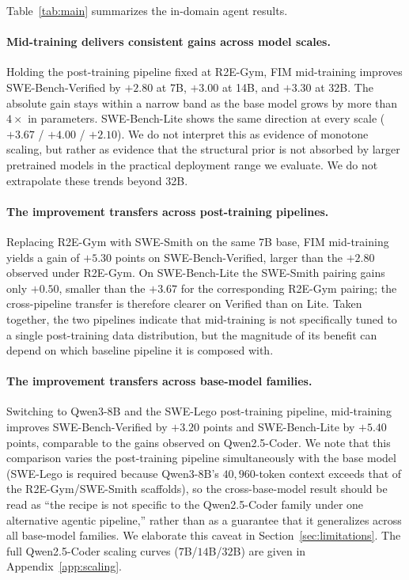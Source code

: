 Table~\ref{tab:main} summarizes the in-domain agent results.

\paragraph{Mid-training delivers consistent gains across model scales.}
Holding the post-training pipeline fixed at R2E-Gym, FIM mid-training
improves SWE-Bench-Verified by $+2.80$ at 7B, $+3.00$ at 14B, and $+3.30$
at 32B. The absolute gain stays within a narrow band as the base model
grows by more than $4{\times}$ in parameters. SWE-Bench-Lite shows the
same direction at every scale ($+3.67$ / $+4.00$ / $+2.10$). We do not
interpret this as evidence of monotone scaling, but rather as evidence
that the structural prior is not absorbed by larger pretrained models in
the practical deployment range we evaluate. We do not extrapolate these
trends beyond 32B.

\paragraph{The improvement transfers across post-training pipelines.}
Replacing R2E-Gym with SWE-Smith on the same 7B base, FIM mid-training
yields a gain of $+5.30$ points on SWE-Bench-Verified, larger than the
$+2.80$ observed under R2E-Gym. On SWE-Bench-Lite the SWE-Smith pairing
gains only $+0.50$, smaller than the $+3.67$ for the corresponding
R2E-Gym pairing; the cross-pipeline transfer is therefore clearer on
Verified than on Lite. Taken together, the two pipelines indicate that
mid-training is not specifically tuned to a single post-training data
distribution, but the magnitude of its benefit can depend on which
baseline pipeline it is composed with.

\paragraph{The improvement transfers across base-model families.}
Switching to Qwen3-8B and the SWE-Lego post-training pipeline,
mid-training improves SWE-Bench-Verified by $+3.20$ points and
SWE-Bench-Lite by $+5.40$ points, comparable to the gains observed on
Qwen2.5-Coder. We note that this comparison varies the post-training
pipeline simultaneously with the base model (SWE-Lego is required because
Qwen3-8B's $40{,}960$-token context exceeds that of the
R2E-Gym/SWE-Smith scaffolds), so the cross-base-model result should be
read as ``the recipe is not specific to the Qwen2.5-Coder family under
one alternative agentic pipeline,'' rather than as a guarantee that it
generalizes across all base-model families. We elaborate this caveat in
Section~\ref{sec:limitations}. The full Qwen2.5-Coder scaling curves
($7$B/$14$B/$32$B) are given in Appendix~\ref{app:scaling}.

